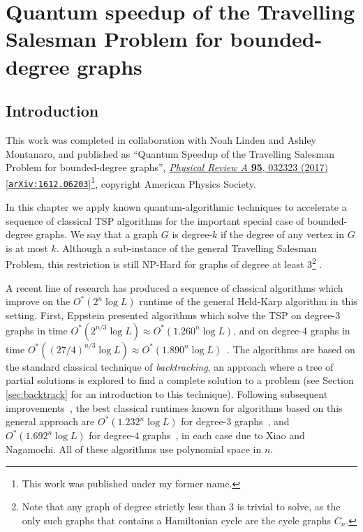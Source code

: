 \chapter{Quantum speedup of the Travelling Salesman Problem for bounded-degree graphs}
\label{chp:tsp}

\section{Introduction}

This work was completed in collaboration with Noah Linden and Ashley Montanaro, and published as ``Quantum Speedup of the Travelling Salesman Problem for bounded-degree graphs'', \href{https://link.aps.org/doi/10.1103/PhysRevA.95.032323}{\textit{Physical Review A} \textbf{95}, 032323 (2017)} [{\tt \href{https://arxiv.org/abs/1612.06203}{arXiv:1612.06203}}]\footnote{This work was published under my former name.}, copyright American Physics Society.

In this chapter we apply known quantum-algorithmic techniques to accelerate a sequence of classical TSP algorithms for the important special case of bounded-degree graphs. We say that a graph $G$ is degree-$k$ if the degree of any vertex in $G$ is at most $k$. Although a sub-instance of the general Travelling Salesman Problem, this restriction is still NP-Hard for graphs of degree at least 3\footnote{Note that any graph of degree strictly less than 3 is trivial to solve, as the only such graphs that contains a Hamiltonian cycle are the cycle graphs $C_n$.} \cite{akiyama1980}.

A recent line of research has produced a sequence of classical algorithms which improve on the $O^*(2^n\log L)$ runtime of the general Held-Karp algorithm in this setting. First, Eppstein presented algorithms which solve the TSP on degree-3 graphs in time $O^*(2^{n/3}\log L) \approx O^*(1.260^n\log L)$, and on degree-4 graphs in time $O^*((27/4)^{n/3}\log L) \approx O^*(1.890^n\log L)$~\cite{eppstein2007}. The algorithms are based on the standard classical technique of {\em backtracking}, an approach where a tree of partial solutions is explored to find a complete solution to a problem (see Section \ref{sec:backtrack} for an introduction to this technique). Following subsequent improvements~\cite{iwama2007,liskiewicz14}, the best classical runtimes known for algorithms based on this general approach are $O^*(1.232^n\log L)$ for degree-3 graphs~\cite{xiao2016degree3}, and $O^*(1.692^n\log L)$ for degree-4 graphs~\cite{xiao2016degree4}, in each case due to Xiao and Nagamochi. All of these algorithms use polynomial space in $n$.

